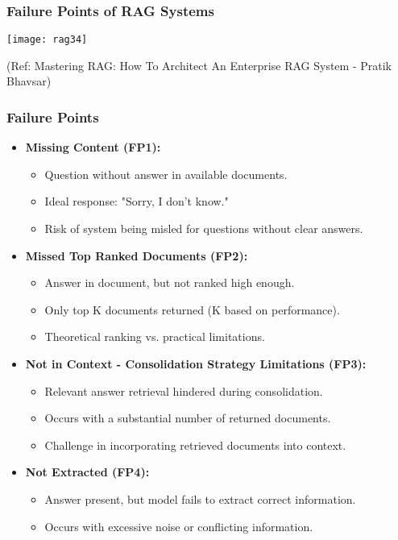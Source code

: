 \begin{frame}[fragile]\frametitle{Failure Points of RAG Systems}


		\begin{center}
		\texttt{[image: rag34]}
		\end{center}

{\tiny (Ref: Mastering RAG: How To Architect An Enterprise RAG System - Pratik Bhavsar)}

\end{frame}

\begin{frame}[fragile]\frametitle{Failure Points}
\begin{itemize}
  \item \textbf{Missing Content (FP1):}
    \begin{itemize}
        \item Question without answer in available documents.
        \item Ideal response: "Sorry, I don’t know."
        \item Risk of system being misled for questions without clear answers.
    \end{itemize}
  
  \item \textbf{Missed Top Ranked Documents (FP2):}
    \begin{itemize}
        \item Answer in document, but not ranked high enough.
        \item Only top K documents returned (K based on performance).
        \item Theoretical ranking vs. practical limitations.
    \end{itemize}
  
  \item \textbf{Not in Context - Consolidation Strategy Limitations (FP3):}
    \begin{itemize}
        \item Relevant answer retrieval hindered during consolidation.
        \item Occurs with a substantial number of returned documents.
        \item Challenge in incorporating retrieved documents into context.
    \end{itemize}
  
  \item \textbf{Not Extracted (FP4):}
    \begin{itemize}
        \item Answer present, but model fails to extract correct information.
        \item Occurs with excessive noise or conflicting information.
    \end{itemize}
  

\end{itemize}
\end{frame}
